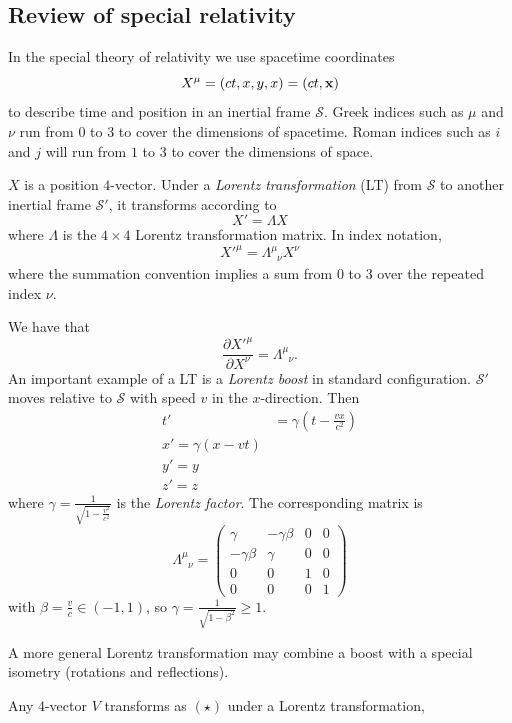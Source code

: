 \documentclass{article}
\newcommand{\glg}{\phantom{\mu}}
\begin{document}
\subsection{Review of special relativity}
In the special theory of relativity we use spacetime coordinates
\[
	X^\mu = (ct,x,y,x)=(ct,\mathbf{x})
\]
to describe time and position in an inertial frame $ \mathcal S $. Greek indices such as $ \mu $ and $ \nu $ run from $ 0 $ to $ 3 $ to cover the dimensions of spacetime. Roman indices such as $ i $ and $ j $ will run from $ 1 $ to $ 3 $ to cover the dimensions of space.\par
$ X $ is a position $ 4 $-vector. Under a \textit{Lorentz transformation} (LT) from $ \mathcal S $ to another inertial frame $ \mathcal S' $, it transforms according to
\begin{equation}
	X' = \Lambda X\tag{$\star$}
\end{equation}
where $ \Lambda $ is the $ 4\times 4 $ Lorentz transformation matrix. In index notation,
\[
	X'^\mu = \Lambda^\mu_{\phantom{\mu} \nu} X^\nu
\]
where the summation convention implies a sum from $ 0 $ to $ 3 $ over the repeated index $ \nu $.\par
We have that
\[
	\frac{\partial X'^\mu}{\partial X^\nu} = \Lambda^\mu_{\glg\nu}.
\]
An important example of a LT is a \textit{Lorentz boost} in standard configuration. $ \mathcal S' $ moves relative to $ \mathcal S $ with speed $ v $ in the $ x $-direction. Then
\begin{align*}
   t'&= \gamma\left(t-\frac{vx}{c^2}\right)\\
   x' = \gamma (x-vt) \\
   y'=y\\
   z'=z
\end{align*}
where $ \gamma = \frac 1{\sqrt{1-\frac{v^2}{c^2}}} $ is the \textit{Lorentz factor}. The corresponding matrix is
\[
	\Lambda^\mu_{\glg \nu} = \begin{pmatrix}
		\gamma& - \gamma\beta & 0 & 0 \\
		-\gamma \beta & \gamma & 0 & 0 \\
		0 & 0 & 1 & 0 \\
		0 & 0 & 0 & 1
	\end{pmatrix}
\]
with $ \beta  =\frac vc\in (-1,1) $, so $ \gamma = \frac 1{\sqrt{1-\beta^2}}\ge 1 $.
\par
A more general Lorentz transformation may combine a boost with a special isometry (rotations and reflections). \par
Any $ 4 $-vector $ V $ transforms as $ (\star) $ under a Lorentz transformation, 
\end{document}
